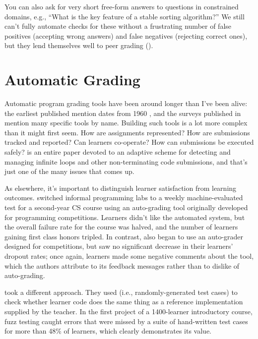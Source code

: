 You can also ask for very short free-form answers to questions in
constrained domains, e.g., ``What is the key feature of a stable
sorting algorithm?''  We still can't fully automate checks for these
without a frustrating number of false positives (accepting wrong
answers) and false negatives (rejecting correct ones), but they lend
themselves well to peer grading ().

\section{Automatic Grading}\label{s:exercises-grading}

Automatic program grading tools have been around longer than I've been
alive: the earliest published mention dates from 1960 \cite{Holl1960},
and the surveys published in \cite{Douc2005,Ihan2010} mention many
specific tools by name.  Building such tools is a lot more complex
than it might first seem.  How are assignments represented? How are
submissions tracked and reported?  Can learners co-operate?  How can
submissions be executed safely? \cite{Edwa2014a} is an entire paper
devoted to an adaptive scheme for detecting and managing infinite
loops and other non-terminating code submissions, and that's just one
of the many issues that comes up.

As elsewhere, it's important to distinguish learner satisfaction from
learning outcomes.  \cite{Magu2018} switched informal programming labs
to a weekly machine-evaluated test for a second-year CS course using
an auto-grading tool originally developed for programming
competitions.  Learners didn't like the automated system, but the
overall failure rate for the course was halved, and the number of
learners gaining first class honors tripled.  In contrast,
\cite{Rubi2014} also began to use an auto-grader designed for
competitions, but saw no significant decrease in their learners'
dropout rates; once again, learners made some negative comments about
the tool, which the authors attribute to its feedback messages rather
than to dislike of auto-grading.

\cite{Srid2016} took a different approach.  They used
 (i.e., randomly-generated test
cases) to check whether learner code does the same thing as a
reference implementation supplied by the teacher.  In the first
project of a 1400-learner introductory course, fuzz testing caught
errors that were missed by a suite of hand-written test cases for more
than 48\% of learners, which clearly demonstrates its value.


